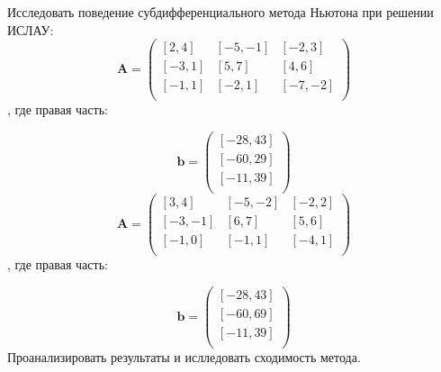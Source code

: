 \documentclass[../body.tex]{subfiles}
\begin{document}
\item Исследовать поведение субдифференциального метода Ньютона при решении ИСЛАУ:
\begin{equation}\label{eq1} 
    \mathbf{A}=
    \begin{pmatrix}
    [2, 4] & [-5, -1] & [-2, 3] \\
    [-3, 1	] & [5, 7] & [4,6] \\
    [-1, 1	] & [-2, 1] & [-7,-2] \\
    \end{pmatrix}
\end{equation}, где правая часть:

\begin{equation}
\mathbf{b}=
\begin{pmatrix}
[-28, 43] \\
[-60, 29]\\
[-11, 39]\\
\end{pmatrix}
\end{equation}
\begin{equation}\label{eq2} 
    \mathbf{A}=
    \begin{pmatrix}
     [3, 4] & [-5, -2] & [-2, 2] \\
    [-3, -1	] & [6, 7] & [5,6] \\
    [-1, 0	] & [-1, 1] & [-4,1] \\
    \end{pmatrix}
\end{equation}, где правая часть:

\begin{equation}
\mathbf{b}=
\begin{pmatrix}
[-28, 43] \\
[-60, 69]\\
[-11, 39]\\
\end{pmatrix}
\end{equation}
Проанализировать результаты и ислледовать сходимость метода.
\end{document}
